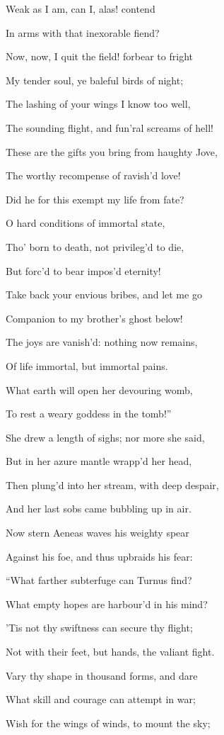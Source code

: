 Weak as I am, can I, alas! contend

In arms with that inexorable fiend?

Now, now, I quit the field! forbear to fright

My tender soul, ye baleful birds of night;

The lashing of your wings I know too well,

The sounding flight, and fun’ral screams of hell!

These are the gifts you bring from haughty Jove,

The worthy recompense of ravish’d love!

Did he for this exempt my life from fate?

O hard conditions of immortal state,

Tho’ born to death, not privileg’d to die,

But forc’d to bear impos’d eternity!

Take back your envious bribes, and let me go

Companion to my brother’s ghost below!

The joys are vanish’d: nothing now remains,

Of life immortal, but immortal pains.

What earth will open her devouring womb,

To rest a weary goddess in the tomb!”

She drew a length of sighs; nor more she said,

But in her azure mantle wrapp’d her head,

Then plung’d into her stream, with deep despair,

And her last sobs came bubbling up in air.

Now stern Aeneas waves his weighty spear

Against his foe, and thus upbraids his fear:

“What farther subterfuge can Turnus find?

What empty hopes are harbour’d in his mind?

’Tis not thy swiftness can secure thy flight;

Not with their feet, but hands, the valiant fight.

Vary thy shape in thousand forms, and dare

What skill and courage can attempt in war;

Wish for the wings of winds, to mount the sky;

